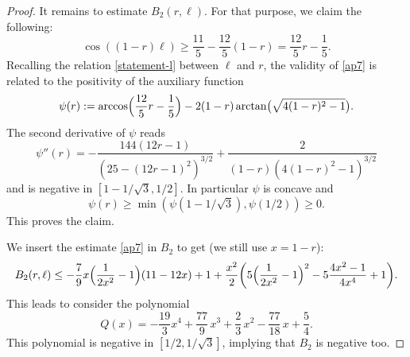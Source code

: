 \begin{proof}
It remains to estimate $B_2(r,\ell)$. For that purpose, we claim the following:
\begin{equation}\label{ap7}
\cos((1-r)\ell) \geq \frac{11}{5} - \frac{12}{5}(1-r) = \frac{12}{5} r - \frac{1}{5}.
\end{equation}
Recalling the relation \eqref{statement-l} between $\ell$ and $r$, the validity of \eqref{ap7} is related to the positivity of the auxiliary function\vspace*{-2pt}
\[
\psi(r):=\arccos\Bigl(\frac{12}{5} r - \frac{1}{5}\Bigr)-
2(1-r)\arctan\bigl(\sqrt{4(1-r)^2-1}\bigr).
\]
The second derivative of $\psi$ reads\vspace*{-2pt}
\[
\psi''(r)=-\frac{144(12 r-1)}{\left( 25-(12 r -1)^2\right)^{3/2}} + \frac{2}{(1-r)(4(1-r)^2-1)^{3/2}}
\]
and is negative in $[1-1/\sqrt{3},1/2]$. In particular $\psi$ is concave and\vspace*{-3pt}
\[
\psi(r)\geq \min (\psi(1-1/\sqrt{3}),\psi(1/2))\geq 0.
\]
This proves the claim.

We insert the estimate \eqref{ap7} in $B_2$ to get (we still use $x=1-r$):
\[
B_2(r,\ell) \leq -\frac{7}{9}x\Bigl(\frac{1}{2x^2}-1\Bigr)(11-12x)+1+\frac{x^2}{2}
\biggl( 5\Bigl(\frac{1}{2x^2}-1\Bigr)^2-5\frac{4x^2-1}{4x^4} +1\biggr).
\]
This leads to consider the polynomial
\[
Q(x)=-\frac{19}{3}x^4+\frac{77}{9}\,x^3+\frac{2}{3}\,x^2-\frac{77}{18}\,x+\frac{5}{4}.
\]
This polynomial is negative in $[1/2,1/\sqrt{3}]$, implying that $B_2$ is negative too.
\end{proof}

